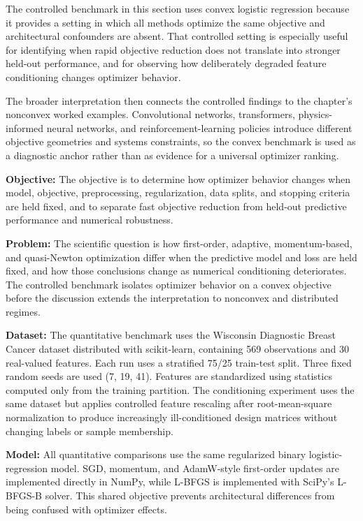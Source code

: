 The controlled benchmark in this section uses convex logistic regression because it provides a setting in which all methods optimize the same objective and architectural confounders are absent. That controlled setting is especially useful for identifying when rapid objective reduction does not translate into stronger held-out performance, and for observing how deliberately degraded feature conditioning changes optimizer behavior.

The broader interpretation then connects the controlled findings to the chapter's nonconvex worked examples. Convolutional networks, transformers, physics-informed neural networks, and reinforcement-learning policies introduce different objective geometries and systems constraints, so the convex benchmark is used as a diagnostic anchor rather than as evidence for a universal optimizer ranking.

\textbf{Objective:} The objective is to determine how optimizer behavior changes when model, objective, preprocessing, regularization, data splits, and stopping criteria are held fixed, and to separate fast objective reduction from held-out predictive performance and numerical robustness.

\textbf{Problem:} The scientific question is how first-order, adaptive, momentum-based, and quasi-Newton optimization differ when the predictive model and loss are held fixed, and how those conclusions change as numerical conditioning deteriorates. The controlled benchmark isolates optimizer behavior on a convex objective before the discussion extends the interpretation to nonconvex and distributed regimes.

\textbf{Dataset:} The quantitative benchmark uses the Wisconsin Diagnostic Breast Cancer dataset distributed with scikit-learn, containing 569 observations and 30 real-valued features. Each run uses a stratified 75/25 train-test split. Three fixed random seeds are used (7, 19, 41). Features are standardized using statistics computed only from the training partition. The conditioning experiment uses the same dataset but applies controlled feature rescaling after root-mean-square normalization to produce increasingly ill-conditioned design matrices without changing labels or sample membership.

\textbf{Model:} All quantitative comparisons use the same regularized binary logistic-regression model. SGD, momentum, and AdamW-style first-order updates are implemented directly in NumPy, while L-BFGS is implemented with SciPy's L-BFGS-B solver. This shared objective prevents architectural differences from being confused with optimizer effects.

